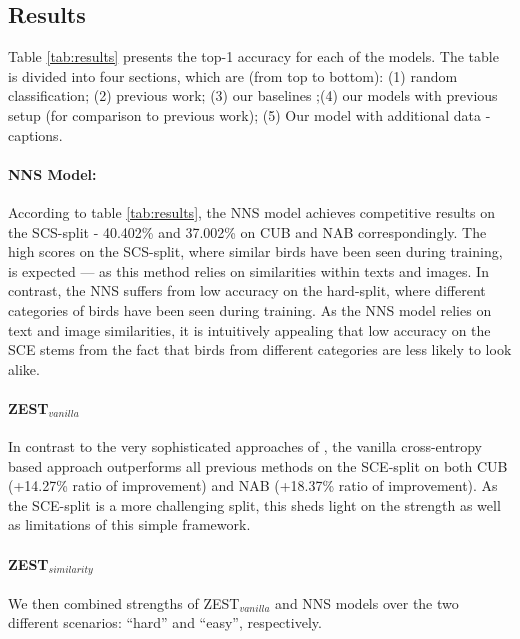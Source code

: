 \documentclass[11pt,a4paper]{article}
\newcommand\yuval[1]{\textcolor{darkpink}{\textbf{YUVAL:} #1 }}
\begin{document}
\subsection{Results}
Table \ref{tab:results} presents the top-1 accuracy for each of the models. 
The table is divided into four sections, which are (from top to bottom): 
(1) random classification; (2) previous work; (3) our baselines ;(4) our models with previous setup (for comparison to previous work); (5) Our model with additional data - captions. 

\paragraph{NNS Model:} 
According to table \ref{tab:results}, the NNS model achieves competitive results on the SCS-split - 40.402\% and 37.002\% on CUB and NAB correspondingly. The high scores on the SCS-split, where similar birds have been seen during training, is expected --- as this method relies on similarities within texts and images. 
%
In contrast, the NNS suffers from low accuracy on the hard-split, where different categories of birds have been seen during training. As the NNS model relies on text and image similarities, it is intuitively appealing that low accuracy on the SCE stems from the fact that birds from different categories are less likely to look alike. 

\paragraph{ZEST$_{vanilla}$}
In contrast to the very sophisticated approaches of \citet{zhu2018generative}, the vanilla cross-entropy based approach %
outperforms all previous methods on the SCE-split on both CUB (+14.27\% ratio of improvement) and NAB (+18.37\% ratio of improvement). As the SCE-split is a more challenging split, this sheds light on the strength as well as limitations of this simple framework. 

\paragraph{ZEST$_{similarity}$}

We then combined strengths of ZEST$_{vanilla}$ and NNS models over the two different scenarios: \enquote{hard} and \enquote{easy}, respectively. 
\end{document}
